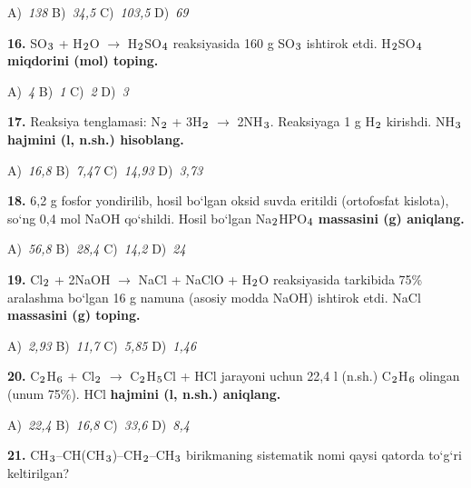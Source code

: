 \documentclass[11pt,a4paper]{article}
\renewcommand{\textsubscript}[1]{\ensuremath{_{\text{\fontsize{8}{8}\selectfont #1}}}}
\begin{document}
\begin{multicols}{2}
\noindent A)~\textsl{138} \hfill B)~\textsl{34,5} \hfill C)~\textsl{103,5} \hfill D)~\textsl{69}\par
\vspace{4pt}
\noindent\textbf{16.} SO\textsubscript{3} + H\textsubscript{2}O $\to$ H\textsubscript{2}SO\textsubscript{4} reaksiyasida 160 g SO\textsubscript{3} ishtirok etdi. H\textsubscript{2}SO\textsubscript{4} \textbf{miqdorini (mol) toping.}

\noindent A)~\textsl{4} \hfill B)~\textsl{1} \hfill C)~\textsl{2} \hfill D)~\textsl{3}\par
\vspace{4pt}
\noindent\textbf{17.} Reaksiya tenglamasi: N\textsubscript{2} + 3H\textsubscript{2} $\to$ 2NH\textsubscript{3}. Reaksiyaga 1 g H\textsubscript{2} kirishdi. NH\textsubscript{3} \textbf{hajmini (l, n.sh.) hisoblang.}

\noindent A)~\textsl{16,8} \hfill B)~\textsl{7,47} \hfill C)~\textsl{14,93} \hfill D)~\textsl{3,73}\par
\vspace{4pt}
\noindent\textbf{18.} 6,2 g fosfor yondirilib, hosil bo`lgan oksid suvda eritildi (ortofosfat kislota), so`ng 0,4 mol NaOH qo`shildi. Hosil bo`lgan Na\textsubscript{2}HPO\textsubscript{4} \textbf{massasini (g) aniqlang.}

\noindent A)~\textsl{56,8} \hfill B)~\textsl{28,4} \hfill C)~\textsl{14,2} \hfill D)~\textsl{24}\par
\vspace{4pt}
\noindent\textbf{19.} Cl\textsubscript{2} + 2NaOH $\to$ NaCl + NaClO + H\textsubscript{2}O reaksiyasida tarkibida 75\% aralashma bo`lgan 16 g namuna (asosiy modda NaOH) ishtirok etdi. NaCl \textbf{massasini (g) toping.}

\noindent A)~\textsl{2,93} \hfill B)~\textsl{11,7} \hfill C)~\textsl{5,85} \hfill D)~\textsl{1,46}\par
\vspace{4pt}
\noindent\textbf{20.} C\textsubscript{2}H\textsubscript{6} + Cl\textsubscript{2} $\to$ C\textsubscript{2}H\textsubscript{5}Cl + HCl jarayoni uchun 22,4 l (n.sh.) C\textsubscript{2}H\textsubscript{6} olingan (unum 75\%). HCl \textbf{hajmini (l, n.sh.) aniqlang.}

\noindent A)~\textsl{22,4} \hfill B)~\textsl{16,8} \hfill C)~\textsl{33,6} \hfill D)~\textsl{8,4}\par
\vspace{4pt}
\noindent\textbf{21.} CH\textsubscript{3}--CH(CH\textsubscript{3})--CH\textsubscript{2}--CH\textsubscript{3} birikmaning sistematik nomi qaysi qatorda to`g`ri keltirilgan?


\end{multicols}
\end{document}
